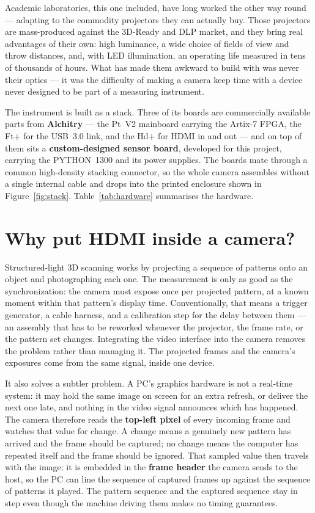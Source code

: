 \documentclass[11pt]{article}
\begin{document}
Academic laboratories, this one included, have long worked the other way round
--- adapting to the commodity projectors they can actually buy. Those projectors are
mass-produced against the 3D-Ready and DLP market, and they bring real advantages of
their own: high luminance, a wide choice of fields of view and throw distances, and,
with LED illumination, an operating life measured in tens of thousands of hours. What
has made them awkward to build with was never their optics --- it was the difficulty of
making a camera keep time with a device never designed to be part of a measuring
instrument.

The instrument is built as a stack. Three of its boards are commercially available
parts from \textbf{Alchitry} --- the Pt~V2 mainboard carrying the Artix-7 FPGA, the
Ft+ for the USB~3.0 link, and the Hd+ for HDMI in and out --- and on top of them sits
a \textbf{custom-designed sensor board}, developed for this project, carrying the
PYTHON~1300 and its power supplies. The boards mate through a common high-density
stacking connector, so the whole camera assembles without a single internal cable and
drops into the printed enclosure shown in Figure~\ref{fig:stack}.
Table~\ref{tab:hardware} summarises the hardware.

\section{Why put HDMI inside a camera?}

Structured-light 3D scanning works by projecting a sequence of patterns onto an
object and photographing each one. The measurement is only as good as the
synchronization: the camera must expose once per projected pattern, at a known
moment within that pattern's display time. Conventionally, that means a trigger
generator, a cable harness, and a calibration step for the delay between them ---
an assembly that has to be reworked whenever the projector, the frame rate, or the
pattern set changes. Integrating the video interface into the camera removes the
problem rather than managing it. The projected frames and the camera's exposures
come from the same signal, inside one device.

It also solves a subtler problem. A PC's graphics hardware is not a real-time
system: it may hold the same image on screen for an extra refresh, or deliver the
next one late, and nothing in the video signal announces which has happened. The
camera therefore reads the \textbf{top-left pixel} of every incoming frame and
watches that value for change. A change means a genuinely new pattern has arrived
and the frame should be captured; no change means the computer has repeated itself
and the frame should be ignored. That sampled value then travels with the image:
it is embedded in the \textbf{frame header} the camera sends to the host, so the PC
can line the sequence of captured frames up against the sequence of patterns it
played. The pattern sequence and the captured sequence stay in step even though the
machine driving them makes no timing guarantees.
\end{document}

